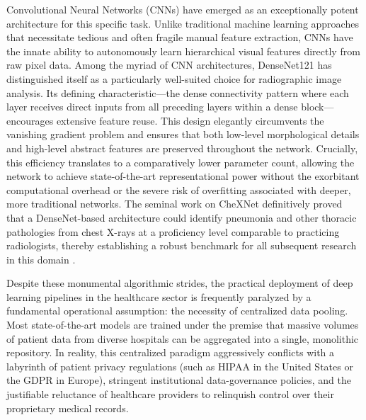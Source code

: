 \documentclass[12pt,a4paper]{report}
\begin{document}
Convolutional Neural Networks (CNNs) have emerged as an exceptionally potent architecture for this specific task. Unlike traditional machine learning approaches that necessitate tedious and often fragile manual feature extraction, CNNs have the innate ability to autonomously learn hierarchical visual features directly from raw pixel data. Among the myriad of CNN architectures, DenseNet121 has distinguished itself as a particularly well-suited choice for radiographic image analysis. Its defining characteristic---the dense connectivity pattern where each layer receives direct inputs from all preceding layers within a dense block---encourages extensive feature reuse. This design elegantly circumvents the vanishing gradient problem and ensures that both low-level morphological details and high-level abstract features are preserved throughout the network. Crucially, this efficiency translates to a comparatively lower parameter count, allowing the network to achieve state-of-the-art representational power without the exorbitant computational overhead or the severe risk of overfitting associated with deeper, more traditional networks. The seminal work on CheXNet definitively proved that a DenseNet-based architecture could identify pneumonia and other thoracic pathologies from chest X-rays at a proficiency level comparable to practicing radiologists, thereby establishing a robust benchmark for all subsequent research in this domain \cite{rajpurkar2017chexnet,huang2017densely}.

Despite these monumental algorithmic strides, the practical deployment of deep learning pipelines in the healthcare sector is frequently paralyzed by a fundamental operational assumption: the necessity of centralized data pooling. Most state-of-the-art models are trained under the premise that massive volumes of patient data from diverse hospitals can be aggregated into a single, monolithic repository. In reality, this centralized paradigm aggressively conflicts with a labyrinth of patient privacy regulations (such as HIPAA in the United States or the GDPR in Europe), stringent institutional data-governance policies, and the justifiable reluctance of healthcare providers to relinquish control over their proprietary medical records. 
\end{document}
